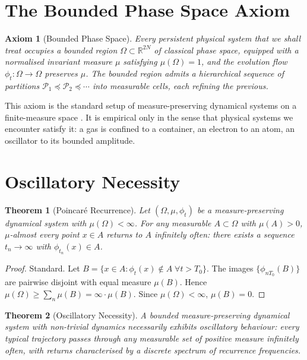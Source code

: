 \documentclass[twocolumn,11pt,a4paper]{article}
\theoremstyle{thmstyle}
\newtheorem{theorem}{Theorem}[section]
\theoremstyle{axiomstyle}
\newtheorem{axiom}{Axiom}
\theoremstyle{definition}
\theoremstyle{remark}
\newcommand{\Real}{\mathbb{R}}
\newcommand{\Pspace}{\mathcal{P}}
\begin{document}
\section{The Bounded Phase Space Axiom}
\label{sec:foundations}

\begin{axiom}[Bounded Phase Space]\label{ax:bps}
Every persistent physical system that we shall treat occupies a bounded region $\Omega\subset\Real^{2N}$ of classical phase space, equipped with a normalised invariant measure $\mu$ satisfying $\mu(\Omega)=1$, and the evolution flow $\phi_{t}:\Omega\to\Omega$ preserves $\mu$. The bounded region admits a hierarchical sequence of partitions $\Pspace_{1}\preceq\Pspace_{2}\preceq\cdots$ into measurable cells, each refining the previous.
\end{axiom}

This axiom is the standard setup of measure-preserving dynamical systems on a finite-measure space \citep{walters1982}. It is empirical only in the sense that physical systems we encounter satisfy it: a gas is confined to a container, an electron to an atom, an oscillator to its bounded amplitude.

\section{Oscillatory Necessity}
\label{sec:oscnec}

\begin{theorem}[Poincar\'e Recurrence]\label{thm:poincare}
Let $(\Omega,\mu,\phi_{t})$ be a measure-preserving dynamical system with $\mu(\Omega)<\infty$. For any measurable $A\subset\Omega$ with $\mu(A)>0$, $\mu$-almost every point $x\in A$ returns to $A$ infinitely often: there exists a sequence $t_{n}\to\infty$ with $\phi_{t_{n}}(x)\in A$.
\end{theorem}

\begin{proof}
Standard. Let $B=\{x\in A:\phi_{t}(x)\notin A\;\forall t>T_{0}\}$. The images $\{\phi_{nT_{0}}(B)\}$ are pairwise disjoint with equal measure $\mu(B)$. Hence $\mu(\Omega)\geq\sum_{n}\mu(B)=\infty\cdot\mu(B)$. Since $\mu(\Omega)<\infty$, $\mu(B)=0$.
\end{proof}

\begin{theorem}[Oscillatory Necessity]\label{thm:oscnec}
A bounded measure-preserving dynamical system with non-trivial dynamics necessarily exhibits oscillatory behaviour: every typical trajectory passes through any measurable set of positive measure infinitely often, with returns characterised by a discrete spectrum of recurrence frequencies.
\end{theorem}
\end{document}
